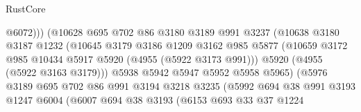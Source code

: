 \begin{lexlean}{RustCore}
\begin{coremodule}
                                      @6072)))
                                (@10628
                                  @695
                                  @702
                                  @86
                                  @3180
                                  @3189
                                  @991
                                  @3237
                                  (@10638
                                    @3180
                                    @3187
                                    @1232
                                    (@10645
                                      @3179
                                      @3186
                                      @1209
                                      @3162
                                      @985
                                      @5877
                                      (@10659
                                        @3172
                                        @985
                                        @10434
                                        @5917
                                        @5920
                                        (@4955 (@5922 @3173 @991)))
                                      @5920
                                      (@4955 (@5922 @3163 @3179)))
                                    @5938
                                    @5942
                                    @5947
                                    @5952
                                    @5958
                                    @5965)
                                  (@5976
                                    @3189
                                    @695
                                    @702
                                    @86
                                    @991
                                    @3194
                                    @3218
                                    @3235
                                    (@5992
                                      @694
                                      @38
                                      @991
                                      @3193
                                      @1247
                                      @6004
                                      (@6007
                                        @694
                                        @38
                                        @3193
                                        (@6153
                                          @693
                                          @33
                                          @37
                                          @1224

\end{coremodule}
\end{lexlean}

